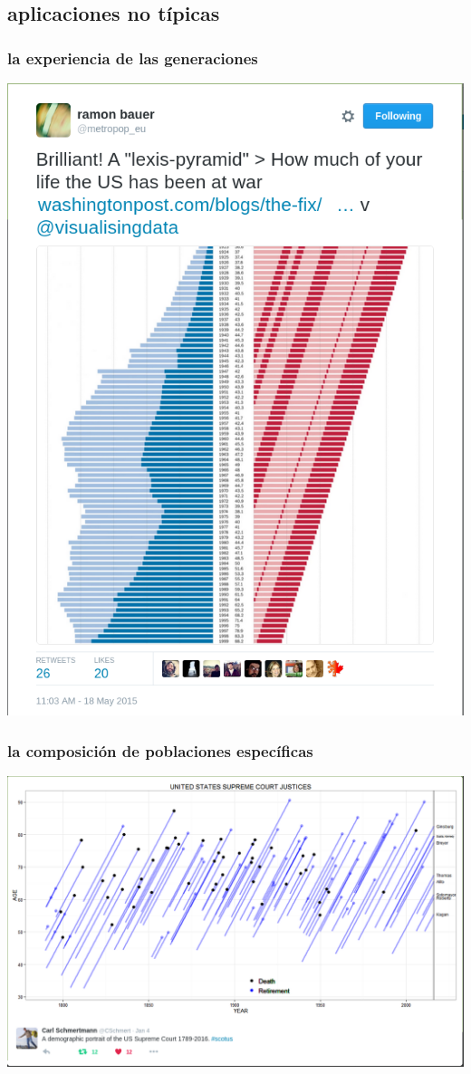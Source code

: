 \documentclass[20pt]{beamer}
\begin{document}
\subsection{aplicaciones no t\'{i}picas}
\begin{frame}
\frametitle{la experiencia de las generaciones}
\includegraphics[scale=.55]{Figures/WPLexisPyramid.png}
\end{frame}

\begin{frame}
\frametitle{la composici\'{o}n de poblaciones espec\'{i}ficas}
\includegraphics[scale=.65]{Figures/SchmertmannJustices.png}
\end{frame}
\end{document}
